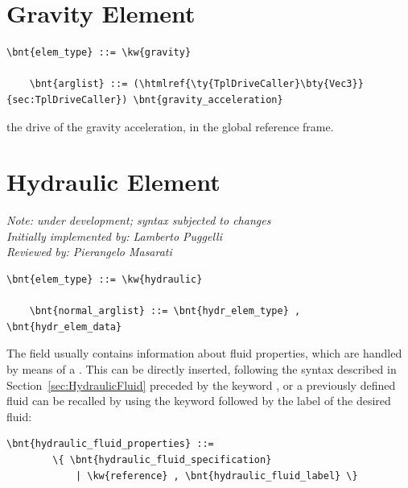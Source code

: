 \section{Gravity Element}
\begin{Verbatim}[commandchars=\\\{\}]
    \bnt{elem_type} ::= \kw{gravity}

    \bnt{arglist} ::= (\htmlref{\ty{TplDriveCaller}\bty{Vec3}}{sec:TplDriveCaller}) \bnt{gravity_acceleration}
\end{Verbatim}
the drive of the gravity acceleration, in the global reference frame.




\section{Hydraulic Element}
\label{sec:EL:HYDR}
{\em 
    Note: under development; syntax subjected to changes \\
    Initially implemented by: Lamberto Puggelli \\
    Reviewed by: Pierangelo Masarati
}

\begin{Verbatim}[commandchars=\\\{\}]
    \bnt{elem_type} ::= \kw{hydraulic}

    \bnt{normal_arglist} ::= \bnt{hydr_elem_type} , \bnt{hydr_elem_data}
\end{Verbatim}
The field  usually contains information
about fluid properties, which are handled by means of a .
This can be directly inserted, following the syntax described in
Section~\ref{sec:HydraulicFluid} preceded by the keyword , or a
previously defined fluid can be recalled by using the keyword 
 followed by the label of the desired fluid:
\begin{Verbatim}[commandchars=\\\{\}]
    \bnt{hydraulic_fluid_properties} ::=
        \{ \bnt{hydraulic_fluid_specification}
            | \kw{reference} , \bnt{hydraulic_fluid_label} \}
\end{Verbatim}

